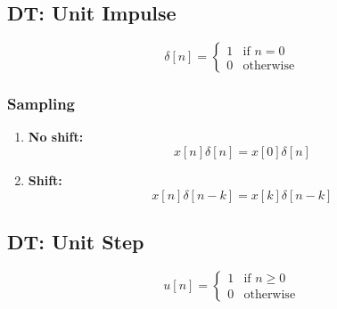 \subsection{DT: Unit Impulse}
\begin{definition}
    \begin{equation}
        \delta[n] = 
        \begin{cases}
        1 & \text{if } n = 0 \\
        0 & \text{otherwise}
        \end{cases}
    \end{equation}

\end{definition}

    \subsubsection{Sampling}
    \begin{definition}
        \begin{enumerate}
            \item \textbf{No shift:}
            \begin{equation}
                x[n] \delta[n] = x[0] \delta[n]
            \end{equation}

            
            \item \textbf{Shift:}
            \begin{equation}
                x[n] \delta[n-k] = x[k] \delta[n-k]
            \end{equation}
        \end{enumerate}
    \end{definition}

\subsection{DT: Unit Step}
\begin{definition}
    \begin{equation}
        u[n] =
        \begin{cases} 
        1 & \text{if } n \geq 0 \\
        0 & \text{otherwise}
        \end{cases}
    \end{equation}     
    
\end{definition}

